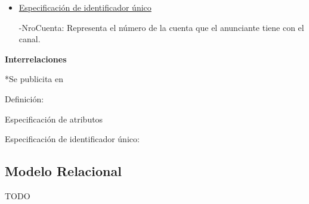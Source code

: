 \documentclass[a4paper,10pt,titlepage]{article}
\begin{document}
\begin{enumerate}
\begin{itemize}
\item \underline{Especificaci\'on de identificador \'unico}

-NroCuenta: Representa el n\'umero de la cuenta que el anunciante tiene con el canal.

\end{itemize}


{\bf Interrelaciones}


*Se publicita en

Definici\'on:

Especificaci\'on de atributos

Especificaci\'on de identificador \'unico:

\end{enumerate}

\pagebreak
\subsection{Modelo Relacional}
TODO
\pagebreak
\end{document}

